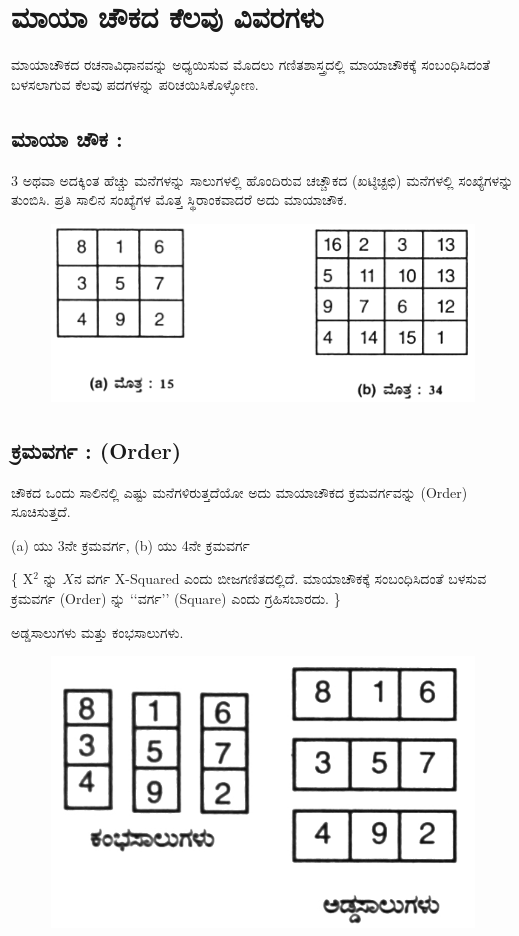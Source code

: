 \chapter{ಮಾಯಾ ಚೌಕದ ಕೆಲವು ವಿವರಗಳು}

ಮಾಯಾಚೌಕದ ರಚನಾವಿಧಾನವನ್ನು ಅಧ್ಯಯಿಸುವ ಮೊದಲು ಗಣಿತಶಾಸ್ತ್ರದಲ್ಲಿ ಮಾಯಾಚೌಕಕ್ಕೆ ಸಂಬಂಧಿಸಿದಂತೆ ಬಳಸಲಾಗುವ ಕೆಲವು ಪದಗಳನ್ನು ಪರಿಚಯಿಸಿಕೊಳ್ಳೋಣ.

\section*{ಮಾಯಾ ಚೌಕ :}

3 ಅಥವಾ ಅದಕ್ಕಿಂತ ಹೆಚ್ಚು ಮನೆಗಳನ್ನು ಸಾಲುಗಳಲ್ಲಿ ಹೊಂದಿರುವ ಚಚ್ಚೌಕದ (ಖಟ್ಠಿಚ್ಟಛಿ) ಮನೆಗಳಲ್ಲಿ ಸಂಖ್ಯೆಗಳನ್ನು ತುಂಬಿಸಿ. ಪ್ರತಿ ಸಾಲಿನ ಸಂಖ್ಯೆಗಳ ಮೊತ್ತ ಸ್ಥಿರಾಂಕವಾದರೆ ಅದು ಮಾಯಾಚೌಕ.
\begin{figure}[H]
\includegraphics{src/figures/chap2/fig2-1.jpg}
\end{figure}

\section*{ಕ್ರಮವರ್ಗ : (Order)}

ಚೌಕದ ಒಂದು ಸಾಲಿನಲ್ಲಿ ಎಷ್ಟು ಮನೆಗಳಿರುತ್ತದೆಯೋ ಅದು ಮಾಯಾಚೌಕದ ಕ್ರಮವರ್ಗವನ್ನು (Order) ಸೂಚಿಸುತ್ತದೆ.

(a) ಯು 3ನೇ ಕ್ರಮವರ್ಗ, (b) ಯು 4ನೇ ಕ್ರಮವರ್ಗ

\{ X$^2$ ನ್ನು $X$ನ ವರ್ಗ  X-Squared ಎಂದು ಬೀಜಗಣಿತದಲ್ಲಿದೆ. ಮಾಯಾಚೌಕಕ್ಕೆ ಸಂಬಂಧಿಸಿದಂತೆ ಬಳಸುವ ಕ್ರಮವರ್ಗ (Order) ನ್ನು ‘‘ವರ್ಗ’’ (Square) ಎಂದು ಗ್ರಹಿಸಬಾರದು. \}

ಅಡ್ಡಸಾಲುಗಳು ಮತ್ತು ಕಂಭಸಾಲುಗಳು.
\begin{figure}[H]
\includegraphics{src/figures/chap2/fig2-2.jpg}
\end{figure}

